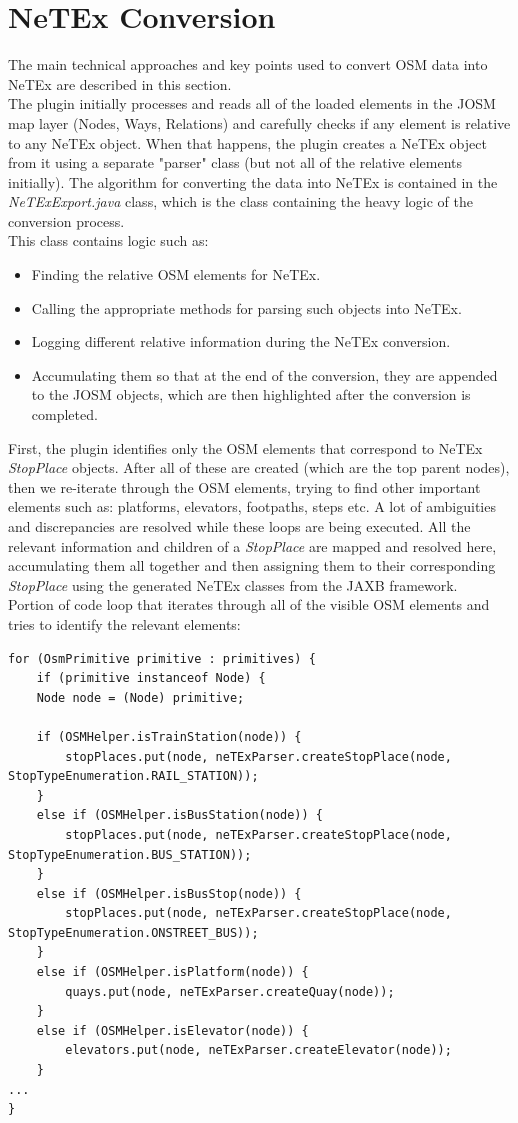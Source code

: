 \section{NeTEx Conversion}
The main technical approaches and key points used to convert OSM data into NeTEx are described in this section.\\
\newline
The plugin initially processes and reads all of the loaded elements in the JOSM map layer (Nodes, Ways, Relations) and carefully checks if any element is relative to any NeTEx object. When that happens, the plugin creates a NeTEx object from it using a separate "parser" class (but not all of the relative elements initially). The algorithm for converting the data into NeTEx is contained in the \textit{NeTExExport.java} class, which is the class containing the heavy logic of the conversion process. \\
This class contains logic such as: 
\begin{itemize}
	\item Finding the relative OSM elements for NeTEx.
	\item Calling the appropriate methods for parsing such objects into NeTEx.
	\item Logging different relative information during the NeTEx conversion.
	\item Accumulating them so that at the end of the conversion, they are appended to the JOSM objects, which are then highlighted after the conversion is completed.
\end{itemize}
First, the plugin identifies only the OSM elements that correspond to NeTEx \textit{StopPlace} objects. After all of these are created (which are the top parent nodes), then we re-iterate through the OSM elements, trying to find other important elements such as: platforms, elevators, footpaths, steps etc. A lot of ambiguities and discrepancies are resolved while these loops are being executed. All the relevant information and children of a \textit{StopPlace} are mapped and resolved here, accumulating them all together and then assigning them to their corresponding \textit{StopPlace} using the generated NeTEx classes from the JAXB framework.\\
\newpage
Portion of code loop that iterates through all of the visible OSM elements and tries to identify the relevant elements:
\begin{verbatim}
for (OsmPrimitive primitive : primitives) {
	if (primitive instanceof Node) {
	Node node = (Node) primitive;

	if (OSMHelper.isTrainStation(node)) {
		stopPlaces.put(node, neTExParser.createStopPlace(node, StopTypeEnumeration.RAIL_STATION));
	}
	else if (OSMHelper.isBusStation(node)) {
		stopPlaces.put(node, neTExParser.createStopPlace(node, StopTypeEnumeration.BUS_STATION));
	}
	else if (OSMHelper.isBusStop(node)) {
		stopPlaces.put(node, neTExParser.createStopPlace(node, StopTypeEnumeration.ONSTREET_BUS));
	}
	else if (OSMHelper.isPlatform(node)) {
		quays.put(node, neTExParser.createQuay(node));
	}
	else if (OSMHelper.isElevator(node)) {
		elevators.put(node, neTExParser.createElevator(node));
	}
...
}
\end{verbatim}
